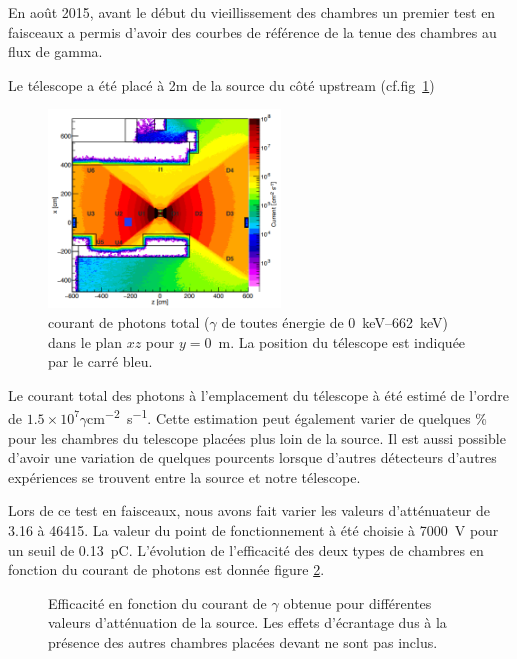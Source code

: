 En août 2015, avant le début du vieillissement des chambres un premier test en faisceaux a permis d'avoir des courbes de référence de la tenue des chambres au flux de gamma.

Le télescope a été placé à 2m de la source du côté upstream (cf.fig~\ref{PositionChambre})

\begin{figure}[!ht]
	\centering
	\includegraphics[width=0.55\textwidth]{GLA/PositionChamber.png}
	\caption{courant de photons total ($\gamma$ de toutes énergie de \SIrange{0}{662}{\kilo\eV}) dans le plan $xz$ pour $y=$\SI{0}{\meter}. La position du télescope est indiquée par le carré bleu.}
	\label{PositionChambre}
\end{figure}

Le courant total des photons à l'emplacement du télescope à été estimé de l'ordre de $1.5\times10^{7}\gamma$\si{cm^{-2}.s^{-1}}. Cette estimation peut également varier de quelques \% pour les chambres du telescope placées plus loin de la source. Il est aussi possible d'avoir une variation de quelques pourcents lorsque d'autres détecteurs d'autres expériences se trouvent entre la source et notre télescope.

Lors de ce test en faisceaux, nous avons fait varier les valeurs d'atténuateur de \num{3.16} à \num{46415}. La valeur du point de fonctionnement à été choisie à \SI{7000}{\volt} pour un seuil de \SI{0.13}{\pico\coulomb}. L'évolution de l'efficacité des deux types de chambres en fonction du courant de photons est donnée figure \ref{ATTENUATEURGIF}.

\begin{figure}[!ht]
	\centering
	\caption{Efficacité en fonction du courant de $\gamma$ obtenue pour différentes valeurs d'atténuation de la source. Les effets d'écrantage dus à la présence des autres chambres placées devant ne sont pas inclus.}
	\label{ATTENUATEURGIF}
\end{figure}

